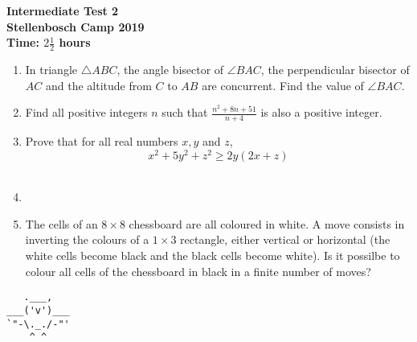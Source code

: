 \documentclass{article}
\begin{document}
\thispagestyle{empty}

\begin{center}
  \textbf{\Large Intermediate Test 2}
  \\ \vspace{1em}
  \textbf{\large Stellenbosch Camp 2019}
  \\ \vspace{1em}
  \textbf{\large Time: $2\frac{1}{2}$ hours}
\end{center}

\vspace{6.81mm}

\begin{enumerate}[1.]

\item %
In triangle $\triangle ABC$, the angle bisector of $\angle BAC$, the perpendicular bisector of $AC$ and the altitude from $C$ to $AB$ are concurrent. Find the value of $\angle BAC$.\\
\vspace{6.81mm}

\item %
Find all positive integers $n$ such that $\frac{n^2 + 8n + 51}{n + 4}$ is also a positive integer.\\
\vspace{6.81mm}

\item %
Prove that for all real numbers $x, y$ and $z$,
$$x^2 + 5y^2 + z^2 \ge 2y(2x + z)$$\\
\vspace{6.81mm}

\item %
\\
\vspace{6.81mm}

\item %
The cells of an $8 \times 8$ chessboard are all coloured in white. A move consists in inverting the colours of a $1 \times 3$ rectangle, either vertical or horizontal (the white cells become black and the black cells become white).
Is it possilbe to colour all cells of the chessboard in black in a finite number of moves? \\

\end{enumerate}


\vfill
\begin{center}
  \begin{BVerbatim}
   .___,   
___('v')___
`"-\._./-"'
    ^ ^ 
  
  \end{BVerbatim}
\end{center}
\end{document}
